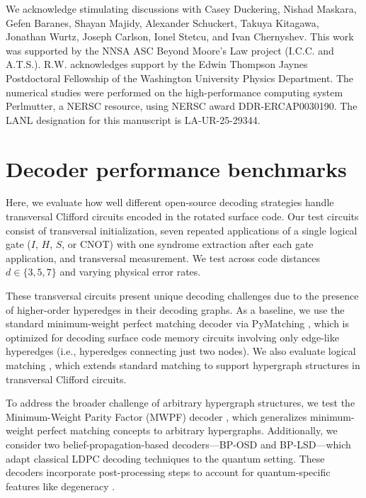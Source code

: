 \documentclass[aps, prx, reprint, superscriptaddress, longbibliography, floatfix]{revtex4-2}
\begin{document}
\begin{acknowledgments}
We acknowledge stimulating discussions with Casey Duckering, Nishad Maskara, Gefen Baranes, Shayan Majidy, Alexander Schuckert, Takuya Kitagawa, Jonathan Wurtz, Joseph Carlson, Ionel Stetcu, and Ivan Chernyshev. This work was supported by the NNSA ASC Beyond Moore's Law project (I.C.C. and A.T.S.). R.W. acknowledges support by the Edwin Thompson Jaynes Postdoctoral Fellowship of the Washington University Physics Department. The numerical studies were performed on the high-performance computing system Perlmutter, a NERSC resource, using NERSC award DDR-ERCAP0030190. The LANL designation for this manuscript is LA-UR-25-29344.
\end{acknowledgments}

\appendix
\section{Decoder performance benchmarks}
\label{sec:decoders}


Here, we evaluate how well different open-source decoding strategies handle transversal Clifford circuits encoded in the rotated surface code. Our test circuits consist of transversal initialization, seven repeated applications of a single logical gate ($I$, $H$, $S$, or CNOT) with one syndrome extraction after each gate application, and transversal measurement. We test across code distances $d \in \{3, 5, 7\}$ and varying physical error rates.

These transversal circuits present unique decoding challenges due to the presence of higher-order hyperedges in their decoding graphs. As a baseline, we use the standard minimum-weight perfect matching decoder via PyMatching \cite{Higgott2025}, which is optimized for decoding surface code memory circuits involving only edge-like hyperedges (i.e., hyperedges connecting just two nodes). We also evaluate logical matching \cite{Cain2025b, serraperalta2025}, which extends standard matching to support hypergraph structures in transversal Clifford circuits.

To address the broader challenge of arbitrary hypergraph structures, we test the Minimum-Weight Parity Factor (MWPF) decoder \cite{wu2025mwpf}, which generalizes minimum-weight perfect matching concepts to arbitrary hypergraphs. Additionally, we consider two belief-propagation-based decoders—BP-OSD and BP-LSD—which adapt classical LDPC decoding techniques to the quantum setting. These decoders incorporate post-processing steps to account for quantum-specific features like degeneracy \cite{Roffe_2020, Roffe_LDPC_tools, delfosse2021}.
\end{document}
